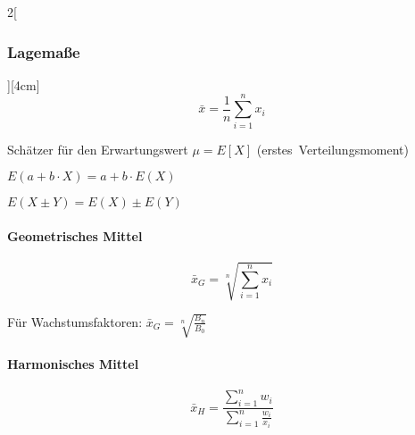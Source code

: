 \documentclass[8pt]{extarticle}
\begin{document}
\begin{multicols}{2}[\subsubsection{Lagemaße}][4cm]
 $$\bar{x}=\frac{1}{n}\sum\limits_{i=1}^n x_i$$

\noindent Schätzer für den Erwartungswert 
$\mu = E[X]$ (erstes~Verteilungsmoment)

\begin{Rechreg}
\item $E(a+b\cdot X)=a+b\cdot E(X)$
\item $E(X\pm Y)=E(X)\pm E(Y)$
\end{Rechreg}

\paragraph{Geometrisches Mittel}

$$\bar{x}_G=\sqrt[n]{\sum\limits_{i=1}^n x_i} $$

\noindent Für Wachstumsfaktoren: $\bar{x}_G=\sqrt[n]{\frac{B_n}{B_0}}$

\paragraph{Harmonisches Mittel}

$$\bar{x}_H=\frac{\sum\limits_{i=1}^n w_i}{\sum\limits_{i=1}^n \frac{w_i}{x_i}}$$


\end{multicols}
\end{document}
